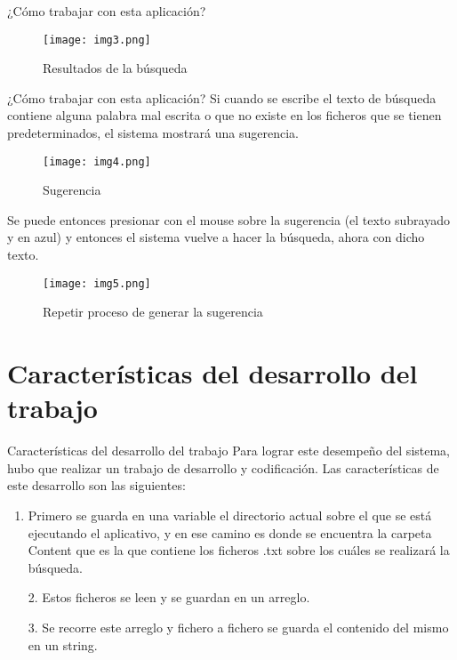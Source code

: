 \documentclass[11pt]{beamer}
\begin{document}
	\begin{frame}{¿Cómo trabajar con esta aplicación?}
		\begin{figure}[H]
			\centering
			\texttt{[image: img3.png]}
			\caption{Resultados de la búsqueda}
			\label{fig: Figura 3}
		\end{figure}
	\end{frame}
	
	\begin{frame}{¿Cómo trabajar con esta aplicación?}
		Si cuando se escribe el texto de búsqueda contiene alguna palabra mal escrita o que no existe en los ficheros que se tienen predeterminados, el sistema mostrará una sugerencia.
	
	\begin{figure}[H]
		\centering
		\texttt{[image: img4.png]}
		\caption{Sugerencia}
		\label{fig: Figura 4}
	\end{figure}
	\end{frame}
	
	\begin{frame}
		\justifying
		Se puede entonces presionar con el mouse sobre la sugerencia (el texto subrayado y en azul) y entonces el sistema vuelve a hacer la búsqueda, ahora con dicho texto.
		
		\begin{figure}[H]
			\centering
			\texttt{[image: img5.png]}
			\caption{Repetir proceso de generar la sugerencia}
			\label{fig: Figura 5}
		\end{figure}
	\end{frame}
	
	\section {Características del desarrollo del trabajo}
	\begin{frame}{Características del desarrollo del trabajo}
		\justifying
		Para lograr este desempeño del sistema, hubo que realizar un trabajo de desarrollo y codificación. Las características de este desarrollo son las siguientes:
		
		\begin{enumerate}
			\item Primero se guarda en una variable el directorio actual sobre el que se está ejecutando el aplicativo, y en ese camino es donde se encuentra la carpeta Content que es la que contiene los ficheros .txt sobre los cuáles se realizará la búsqueda.
			
			\item[2.] Estos ficheros se leen y se guardan en un arreglo.
			
			\item[3.] Se recorre este arreglo y fichero a fichero se guarda el contenido del mismo en un string. 
		\end{enumerate}
	\end{frame}
	
\end{document}
